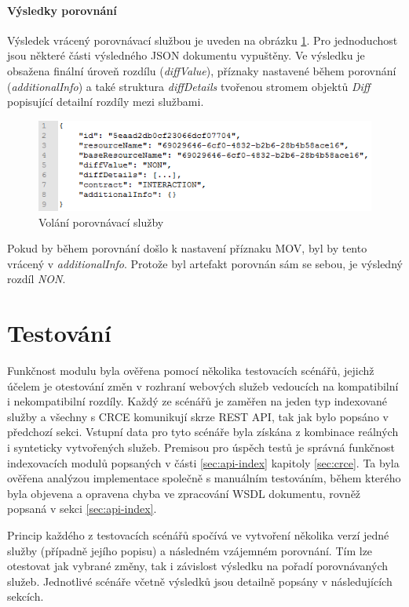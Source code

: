 \documentclass[czech,DP]{thesiskiv}
\begin{document}
\paragraph{Výsledky porovnání}
Výsledek vrácený porovnávací službou je uveden na obrázku \ref{fig:apicomp-res}. Pro jednoduchost jsou některé části výsledného JSON dokumentu vypuštěny. Ve výsledku je obsažena finální úroveň rozdílu (\textit{diffValue}), příznaky nastavené během porovnání (\textit{additionalInfo}) a také struktura \textit{diffDetails} tvořenou stromem objektů \textit{Diff} popisující detailní rozdíly mezi službami.

\begin{figure}[h]
	\centering
	\includegraphics[width=\linewidth]{apicomp-res.png}
	\caption{Volání porovnávací služby}
	\label{fig:apicomp-res}
\end{figure}

Pokud by během porovnání došlo k nastavení příznaku MOV, byl by tento vrácený v \textit{additionalInfo}. Protože byl artefakt porovnán sám se sebou, je výsledný rozdíl \textit{NON}.

\section{Testování}

Funkčnost modulu byla ověřena pomocí několika testovacích scénářů, jejichž účelem je otestování změn v rozhraní webových služeb vedoucích na kompatibilní i nekompatibilní rozdíly. Každý ze scénářů je zaměřen na jeden typ indexované služby a všechny s CRCE komunikují skrze REST API, tak jak bylo popsáno v předchozí sekci. Vstupní data pro tyto scénáře byla získána z kombinace reálných i synteticky vytvořených služeb. Premisou pro úspěch testů je správná funkčnost indexovacích modulů popsaných v části \ref{sec:api-index} kapitoly \ref{sec:crce}. Ta byla ověřena analýzou implementace společně s manuálním testováním, během kterého byla objevena a opravena chyba ve zpracování WSDL dokumentu, rovněž popsaná v sekci \ref{sec:api-index}.

Princip každého z testovacích scénářů spočívá ve vytvoření několika verzí jedné služby (případně jejího popisu) a následném vzájemném porovnání. Tím lze otestovat jak vybrané změny, tak i závislost výsledku na pořadí porovnávaných služeb. Jednotlivé scénáře včetně výsledků jsou detailně popsány v následujících sekcích.
\end{document}
